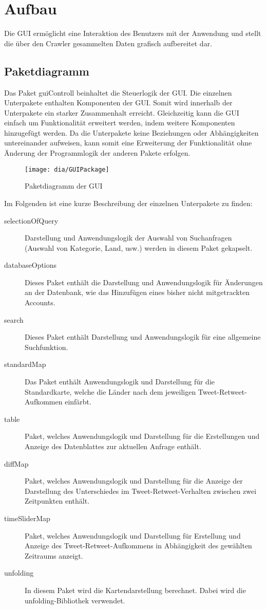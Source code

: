 \section{Aufbau}
Die GUI ermöglicht eine Interaktion des Benutzers mit der Anwendung und stellt die über den Crawler gesammelten Daten grafisch aufbereitet dar.\\
\subsection{Paketdiagramm}
Das Paket {guiControll} beinhaltet die Steuerlogik der GUI. Die einzelnen Unterpakete enthalten  Komponenten der GUI. Somit wird innerhalb der Unterpakete ein starker Zusammenhalt erreicht. Gleichzeitig kann die GUI einfach um Funktionalität erweitert werden, indem weitere Komponenten hinzugefügt werden. Da die Unterpakete keine Beziehungen oder Abhängigkeiten untereinander aufweisen, kann somit eine Erweiterung der Funktionalität ohne Änderung der Programmlogik der anderen Pakete erfolgen. 


\begin{figure}[h!]
	\centering
	\texttt{[image: dia/GUIPackage]}
	\caption{Paketdiagramm der GUI}
	\label{fig:GUI}
\end{figure}


Im Folgenden ist eine kurze Beschreibung der einzelnen Unterpakete zu finden:
\begin{description}
		\item [selectionOfQuery] Darstellung und Anwendungslogik  der Auswahl von Suchanfragen (Auswahl von Kategorie, Land, usw.) werden in diesem Paket gekapselt.
		\item[databaseOptions] Dieses Paket enthält die Darstellung und Anwendungslogik für Änderungen an der Datenbank, wie das Hinzufügen eines bisher nicht mitgetrackten Accounts.
		\item[search] Dieses Paket enthält Darstellung und Anwendungslogik für eine allgemeine Suchfunktion.
		\item [standardMap] Das Paket enthält Anwendungslogik und Darstellung für die Standardkarte, welche die Länder nach dem jeweiligen Tweet-Retweet-Aufkommen einfärbt.
		\item [table] Paket, welches Anwendungslogik und Darstellung für die Erstellungen und Anzeige des Datenblattes zur aktuellen Anfrage enthält.
		\item[diffMap] Paket, welches Anwendungslogik und Darstellung für die Anzeige der Darstellung des Unterschiedes im Tweet-Retweet-Verhalten zwischen zwei Zeitpunkten enthält.
		\item [timeSliderMap] Paket, welches Anwendungslogik und Darstellung für Erstellung und Anzeige des Tweet-Retweet-Aufkommens in Abhängigkeit des gewählten Zeitraums anzeigt.
		\item [unfolding] In diesem Paket wird die Kartendarstellung berechnet. Dabei wird die unfolding-Bibliothek verwendet.
		
\end{description}

